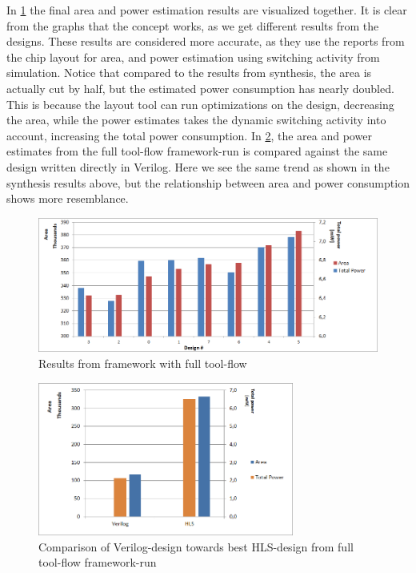 In \cref{fig:resultgraphframeworkrun3} the final area and power estimation results are visualized together. It is clear from the graphs that the concept works, as we get different results from the designs. These results are considered more accurate, as they use the reports from the chip layout for area, and power estimation using switching activity from simulation. Notice that compared to the results from synthesis, the area is actually cut by half, but the estimated power consumption has nearly doubled. This is because the layout tool can run optimizations on the design, decreasing the area, while the power estimates takes the dynamic switching activity into account, increasing the total power consumption. In \cref{fig:resultcomparisonhlsrun3}, the area and power estimates from the full tool-flow framework-run is compared against the same design written directly in Verilog. Here we see the same trend as shown in the synthesis results above, but the relationship between area and power consumption shows more resemblance.

\begin{figure}[hbpt]
\centering
\includegraphics[width=\textwidth]{../figs/resultGraph3.png}
\caption{\label{fig:resultgraphframeworkrun3}Results from framework with full tool-flow}
\end{figure}

\begin{figure}[hbpt]
\centering
\includegraphics[width=0.75\textwidth]{../figs/resultComparison3.png}
\caption{\label{fig:resultcomparisonhlsrun3}Comparison of Verilog-design towards best HLS-design from full tool-flow framework-run}
\end{figure}

